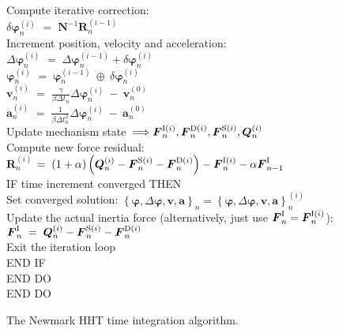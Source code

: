 \begin{figure}[t]
\begin{tabbing}
Compute iterative correction: \\
$\delta\bm{\varphi}_n^{(i)}$ \> $=\; \bm{N}^{-1} \bm{R}_n^{(i-1)}$ \\[2mm]

Increment position, velocity and acceleration:\\
$\Delta\bm{\varphi}_n^{(i)}$ \> $=\; \Delta\bm{\varphi}_n^{(i-1)} + \delta\bm{\varphi}_n^{(i)}$ \\[1mm]
$\bm{\varphi}_n^{(i)}$ \> $=\; \bm{\varphi}_n^{(i-1)} \:\oplus\: \delta\bm{\varphi}_n^{(i)}$ \\[1mm]
$\bm{v}_n^{(i)}$ \> $=\; \frac{\gamma}{\beta\Delta t_n}\Delta\bm{\varphi}_n^{(i)} \:-\: \bm{v}_n^{(0)}$ \\[1mm]
$\bm{a}_n^{(i)}$ \> $=\; \frac{1}{\beta\Delta t_n^2}\Delta\bm{\varphi}_n^{(i)} \:-\: \bm{a}_n^{(0)}$ \\[2mm]

Update mechanism state~$\Longrightarrow \mbox{\boldmath $F$}_n^{{\rm I}(i)}, \mbox{\boldmath $F$}_n^{{\rm D}(i)}, \mbox{\boldmath $F$}_n^{{\rm S}(i)}, \mbox{\boldmath $Q$}_n^{(i)}$ \\[2mm]

Compute new force residual: \\
$\bm{R}_n^{(i)}$ \> $=\; (1+\alpha)\left(\bm{Q}_n^{(i)} - \bm{F}_n^{{\rm S}(i)} - \bm{F}_n^{{\rm D}(i)}\right)
                     - \bm{F}_n^{{\rm I}(i)} - \alpha\bm{F}_\nm1^{\rm I}$ \\[2mm]

IF time increment converged THEN \+\\[1mm]
Set converged solution: $\left\{\bm{\varphi},\Delta\bm{\varphi},\bm{v},\bm{a}\right\}_n =
\left\{\bm{\varphi},\Delta\bm{\varphi},\bm{v},\bm{a}\right\}_n^{(i)}$ \\[1mm]
Update the actual inertia force (alternatively, just use $\mbox{\boldmath $F$}_n^{\rm I} = \mbox{\boldmath $F$}_n^{{\rm I}(i)}$): \\
$\mbox{\boldmath $F$}_n^{\rm I} \;=\; \mbox{\boldmath $Q$}_n^{(i)} - \mbox{\boldmath $F$}_n^{{\rm S}(i)} - \mbox{\boldmath $F$}_n^{{\rm D}(i)}$ \\[2mm]
Exit the iteration loop \-\\[1mm]
END IF \-\\[1mm]
END DO \-\\[1mm]
END DO
\end{tabbing}
\caption{The Newmark HHT time integration algorithm.}
\label{fig:Newmark}
\end{figure}

